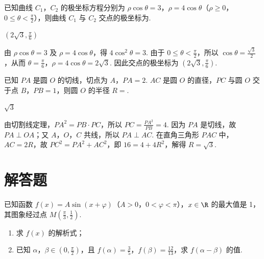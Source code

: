 \begin{problem}
已知曲线 \(C_1\)，\(C_2\) 的极坐标方程分别为 \(\rho \cos \theta = 3\)，\(\rho = 4 \cos \theta\)（\(\rho \geqslant 0\)，\(0 \leqslant \theta < \frac{\pi}{2}\)），则曲线 \(C_1\) 与 \(C_2\) 交点的极坐标为\fillinblank{}.
\end{problem}

\begin{answer}
\(\left(2\sqrt{3},\frac{\pi}{6}\right)\)
\end{answer}

\begin{solution}
由 \(\rho\cos\theta=3\) 及 \(\rho=4\cos\theta\)，得 \(4\cos^2\theta=3\). 由于 \(0\leqslant\theta<\frac{\pi}{2}\)，所以 \(\cos\theta=\frac{\sqrt3}{2}\)，从而 \(\theta=\frac{\pi}{6}\)，\(\rho=4\cos\theta=2\sqrt3\). 因此交点的极坐标为 \(\left(2\sqrt3,\frac\pi6\right)\).
\end{solution}

\begin{problem}
已知 \(PA\) 是圆 \(O\) 的切线，切点为 \(A\)，\(PA = 2\). \(AC\) 是圆 \(O\) 的直径，\(PC\) 与圆 \(O\) 交于点 \(B\)，\(PB = 1\)，则圆 \(O\) 的半径 \(R =\)\fillinblank{}.
\end{problem}

\begin{answer}
\(\sqrt{3}\)
\end{answer}

\begin{solution}
由切割线定理，\(PA^2=PB\cdot PC\)，所以 \(PC=\frac{PA^2}{PB}=4\). 因为 \(PA\) 是切线，故 \(PA\perp OA\)；又 \(A\)，\(O\)，\(C\) 共线，所以 \(PA\perp AC\). 在直角三角形 \(PAC\) 中，\(AC=2R\)，故
\(PC^2=PA^2+AC^2\)，即 \(16=4+4R^2\)，解得 \(R=\sqrt3\).
\end{solution}

\section{解答题}

\begin{problem}
已知函数 \(f(x) = A \sin (x + \varphi)\)（\(A > 0\)，\(0 < \varphi < \pi\)），\(x \in \R\) 的最大值是 1，其图象经过点 \(M\left( \frac{\pi}{3}, \frac{1}{2} \right)\).

\begin{enumerate}
\item 求 \(f(x)\) 的解析式；
\item 已知 \(\alpha\)，\(\beta \in \left( 0, \frac{\pi}{2} \right)\)，且 \(f(\alpha) = \frac{3}{5}\)，\(f(\beta) = \frac{12}{13}\)，求 \(f(\alpha - \beta)\) 的值.
\end{enumerate}
\end{problem}

